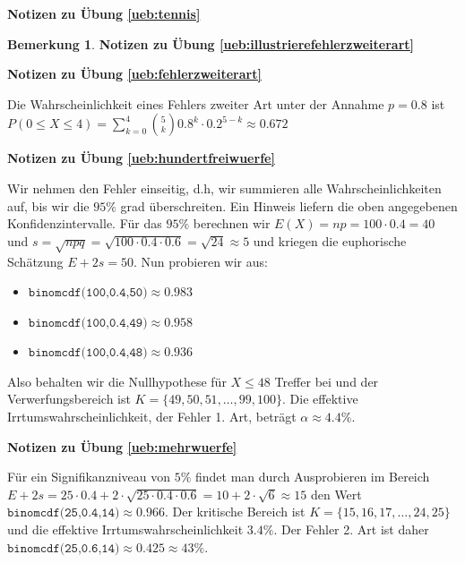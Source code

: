 \documentclass[%
<<<<<<< Updated upstream
11pt,%
twoside,%
titlepage,%
german,%
=======
11pt,%
twoside,%
titlepage,%
swissgerman,%
>>>>>>> Stashed changes
headsepline%
]{scrartcl}
\newcommand{\faReturnGray}{\textcolor{gray}{\faMailReply}} %
\theoremstyle{definition}
\newtheorem{bem}{Bemerkung}[subsection] %
\theoremstyle{plain}
\newcommand{\concatueb}[1]{ueb:#1}%
\newcommand{\concatlsg}[1]{lsg:#1}%
\newenvironment{lsg}[1]{%
    \par\noindent\textbf{Notizen zu Übung \ref{\concatueb{#1}}}\label{\concatlsg{#1}}
    \hfill\hyperref[\concatueb{#1}]{\faReturnGray}\par %
}{%
    \par%
}
\newcounter{theo}[section]\setcounter{theo}{0}
\newcommand{\concatueb}[1]{ueb:#1}%
\newcommand{\concatlsg}[1]{lsg:#1}%
\newenvironment{lsg}[1]{%
    \par\noindent\textbf{Notizen zu Übung \ref{\concatueb{#1}}.}%
    \label{\concatlsg{#1}}
}{%
    \par%
}
\begin{document}
\begin{lsg}{tennis}
\begin{bem}
\begin{lsg}{illustrierefehlerzweiterart}
\begin{center}
\end{center}
\end{lsg}
\begin{lsg}{fehlerzweiterart}
    Die Wahrscheinlichkeit eines Fehlers zweiter Art unter der Annahme $p=0.8$ ist $P(0\leq X\leq4)=\sum_{k=0}^4\binom{5}{k}0.8^k\cdot0.2^{5-k}\approx0.672$
\end{lsg}
\begin{lsg}{hundertfreiwuerfe}
    Wir nehmen den Fehler einseitig, d.h, wir summieren alle Wahrscheinlichkeiten auf, bis wir die $95\%$ grad überschreiten. Ein Hinweis liefern die oben angegebenen Konfidenzintervalle. Für das $95\%$ berechnen wir $E(X)=np=100\cdot0.4=40$ und $s=\sqrt{npq}=\sqrt{100\cdot0.4\cdot0.6}=\sqrt{24}\approx5$ und kriegen die euphorische Schätzung $E+2s=50$. Nun probieren wir aus:
    \begin{itemize}
        \item $\texttt{binomcdf(100,0.4,50)}\approx0.983$
        \item $\texttt{binomcdf(100,0.4,49)}\approx0.958$
        \item $\texttt{binomcdf(100,0.4,48)}\approx0.936$
    \end{itemize}
    Also behalten wir die Nullhypothese für $X\leq48$ Treffer bei und der Verwerfungsbereich ist $K=\{49,50,51,\dots,99,100\}$. Die effektive Irrtumswahrscheinlichkeit, der Fehler 1. Art, beträgt $\alpha\approx4.4\%$.
\end{lsg}
\begin{lsg}{mehrwuerfe}
    Für ein Signifikanzniveau von $5\%$ findet man durch Ausprobieren im Bereich $E+2s=25\cdot0.4+2\cdot\sqrt{25\cdot0.4\cdot0.6}=10+2\cdot\sqrt{6}\approx15$ den Wert $\texttt{binomcdf(25,0.4,14)}\approx0.966$. Der kritische Bereich ist $K=\{15,16,17,\dots,24,25\}$ und die effektive Irrtumswahrscheinlichkeit $3.4\%$. Der Fehler 2. Art ist daher\linebreak $\texttt{binomcdf(25,0.6,14)}\approx0.425\approx43\%$.


\end{lsg}
\end{bem}
\end{lsg}
\end{document}

